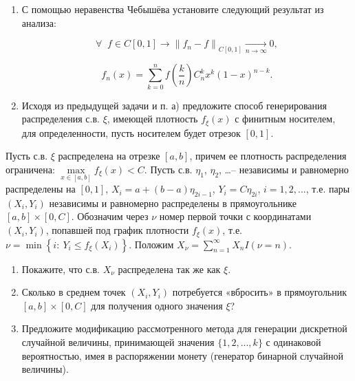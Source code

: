 \begin{problem} 
\begin{enumerate}

\item С помощью неравенства Чебышёва установите следующий результат из анализа: 

\[
\forall \; \; f\in C\left[0,1\right]\to \left\| f_{n} -f\right\| _{C\left[0,1\right]} \xrightarrow[{n\to \infty }]{} 0,
\] 

\[
f_{n} \left(x\right)=\sum_{k=0}^{n}f\left(\frac{k}{n} \right) C_{n}^{k} x^{k} \left(1-x\right)^{n-k}. 
\]

\item Исходя из предыдущей задачи и п. а) предложите способ генерирования распределения с.в. $\xi $, имеющей плотность $f_{\xi } \left(x\right)$ с финитным носителем, для определенности, пусть носителем будет отрезок $\left[0,1\right]$.

\end{enumerate}

\end{problem}

\begin{problem} 

Пусть с.в. $\xi $ распределена на отрезке $\left[a,b\right]$, причем ее плотность распределения ограничена: $\mathop{\max }\limits_{x\in \left[a,b\right]} f_{\xi } (x) < C$. Пусть с.в. $\eta _{1} $, $\eta _{2} $, \dots  -- независимы и равномерно распределены на $\left[0,1\right]$, $X_{i} =a+\left(b-a\right)\eta _{2i-1} $, $Y_{i} =C\eta _{2i} $, $i=1,2,...$, т.е. пары $\left(X_{i} ,Y_{i} \right)$ независимы и равномерно распределены в прямоугольнике $\left[a,b\right]\times \left[0,C\right]$. Обозначим через $\nu $ номер первой точки с координатами $\left(X_{i} ,Y_{i} \right)$, попавшей под график плотности $f_{\xi } (x)$, т.е. $\nu =\min \left\{i:\: Y_{i} \le f_{\xi } (X_{i} )\right\}$. Положим $X_{\nu } =\sum _{n=1}^{\infty }X_{n} I\left(\nu =n\right) $.

\begin{enumerate}
\item Покажите, что с.в. $X_{\nu } $ распределена так же как $\xi $.

\item Сколько в среднем точек $\left(X_{i} ,Y_{i} \right)$ потребуется «вбросить» в прямоугольник $\left[a,b\right]\times \left[0,C\right]$ для получения одного значения $\xi $?

\item Предложите модификацию рассмотренного метода для генерации дискретной случайной величины, принимающей значения $\lbrace 1, 2, ... , k \rbrace$ с одинаковой вероятностью, имея в распоряжении монету (генератор бинарной случайной величины).   
\end{enumerate}
\end{problem}

